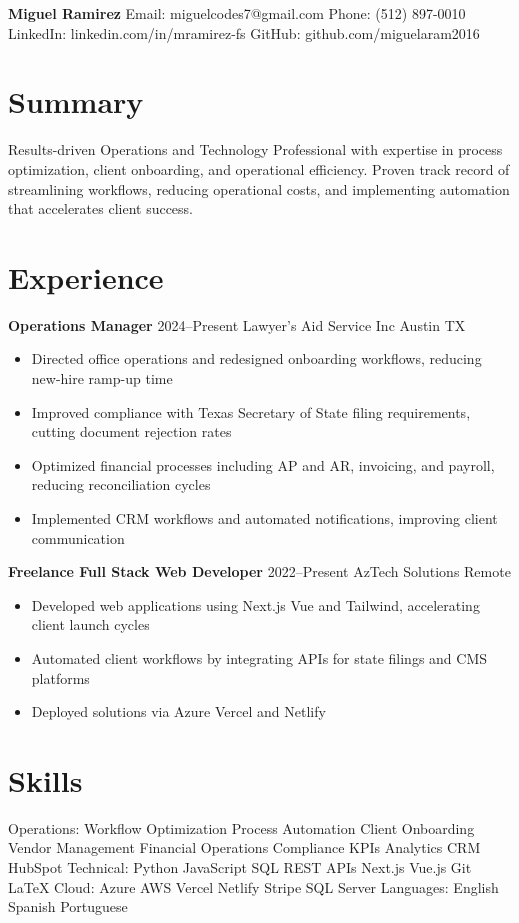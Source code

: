 \documentclass[11pt]{article}
\begin{document}
\textbf{\LARGE Miguel Ramirez}
Email: miguelcodes7@gmail.com \quad Phone: (512) 897-0010
LinkedIn: linkedin.com/in/mramirez-fs \quad GitHub: github.com/miguelaram2016

\section{Summary}
Results-driven Operations and Technology Professional with expertise in process optimization, client onboarding, and operational efficiency. Proven track record of streamlining workflows, reducing operational costs, and implementing automation that accelerates client success.

\section{Experience}
\textbf{Operations Manager} \hfill 2024--Present
Lawyer's Aid Service Inc Austin TX
\begin{itemize}
  \item Directed office operations and redesigned onboarding workflows, reducing new-hire ramp-up time
  \item Improved compliance with Texas Secretary of State filing requirements, cutting document rejection rates
  \item Optimized financial processes including AP and AR, invoicing, and payroll, reducing reconciliation cycles
  \item Implemented CRM workflows and automated notifications, improving client communication
\end{itemize}

\textbf{Freelance Full Stack Web Developer} \hfill 2022--Present
AzTech Solutions Remote
\begin{itemize}
  \item Developed web applications using Next.js Vue and Tailwind, accelerating client launch cycles
  \item Automated client workflows by integrating APIs for state filings and CMS platforms
  \item Deployed solutions via Azure Vercel and Netlify
\end{itemize}

\section{Skills}
Operations: Workflow Optimization Process Automation Client Onboarding Vendor Management Financial Operations Compliance KPIs Analytics CRM HubSpot
Technical: Python JavaScript SQL REST APIs Next.js Vue.js Git LaTeX
Cloud: Azure AWS Vercel Netlify Stripe SQL Server
Languages: English Spanish Portuguese
\end{document}
